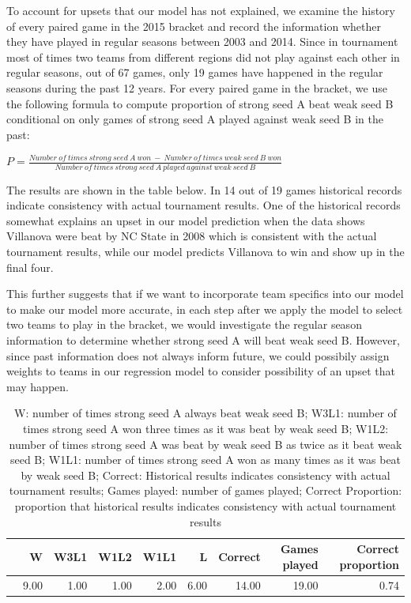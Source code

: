 \documentclass{article} %
\begin{document}
To account for upsets that our model has not explained, we examine the history of every paired game in the 2015 bracket and record the information whether they have played in regular seasons between 2003 and 2014. Since in tournament most of times two teams from different regions did not play against each other in regular seasons, out of 67 games, only 19 games have happened in the regular seasons during the past 12 years. For every paired game in the bracket, we use the following formula to compute proportion of strong seed A beat weak seed B conditional on only games of strong seed A played against weak seed B in the past:

$P=\frac{Number \ of \ times \ strong \ seed \ A \ won \ - \ Number \ of \ times \ weak \ seed \ B \ won}{Number \ of \ times \ strong \ seed \ A \ played \ against \ weak \ seed \ B }$


The results are shown in the table below. In 14 out of 19 games historical records indicate consistency with actual tournament results. One of the historical records somewhat explains an upset in our model prediction when the data shows Villanova were beat by NC State in 2008 which is consistent with the actual tournament results, while our model predicts Villanova to win and show up in the final four. 

This further suggests that if we want to incorporate team specifics into our model to make our model more accurate, in each step after we apply the model to select two teams to play in the bracket, we would investigate the regular season information to determine whether strong seed A will beat weak seed B. However, since past information does not always inform future, we could possibily assign weights to teams in our regression model to consider possibility of an upset that may happen. 


\begin{table}[ht]
\centering
\begin{tabular}{rrrrrrrrr}
\hline
& W & W3L1 & W1L2 & W1L1 & L & Correct & Games played & Correct proportion \\ 
\hline
& 9.00 & 1.00 & 1.00 & 2.00 & 6.00 & 14.00 & 19.00 & 0.74 \\ 
\hline
\end{tabular}

\caption{W: number of times strong seed A always beat weak seed B; W3L1: number of times strong seed A won three times as it was beat by weak seed B; W1L2: number of times strong seed A was beat by weak seed B as twice as it beat weak seed B; W1L1: number of times strong seed A won as many times as it was beat by weak seed B; Correct: Historical results indicates consistency with actual tournament results; Games played: number of games played; Correct Proportion: proportion that historical results indicates consistency with actual tournament results}
\end{table}
\end{document}
